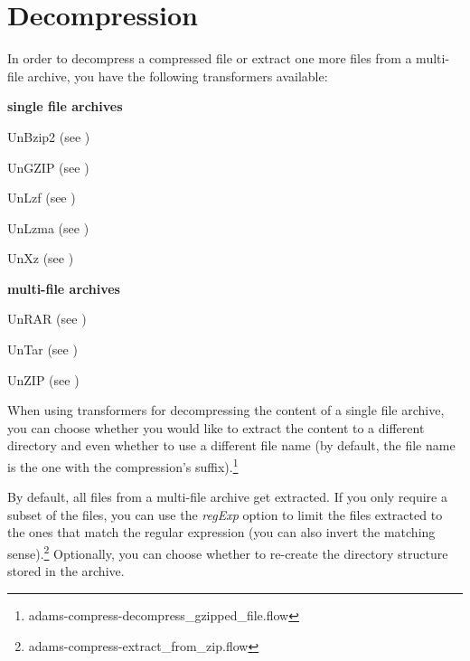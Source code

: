 \documentclass[a4paper]{book}
\begin{document}
\chapter{Decompression}
In order to decompress a compressed file or extract one more files from a
multi-file archive, you have the following transformers available:
\begin{tight_itemize}
	\item \textbf{single file archives}
	\begin{tight_itemize}
		\item UnBzip2 (see \cite{bzip2})
		\item UnGZIP (see \cite{gzip})
		\item UnLzf (see \cite{lzf})
		\item UnLzma (see \cite{lzma})
		\item UnXz (see \cite{xz})
	\end{tight_itemize}
	\item \textbf{multi-file archives}
	\begin{tight_itemize}
		\item UnRAR (see \cite{rar})
		\item UnTar (see \cite{tar})
		\item UnZIP (see \cite{zip})
	\end{tight_itemize}
\end{tight_itemize}

When using transformers for decompressing the content of a single file archive,
you can choose whether you would like to extract the content to a different 
directory and even whether to use a different file name (by default, the file name
is the one with the compression's suffix).\footnote{adams-compress-decompress\_gzipped\_file.flow}

By default, all files from a multi-file archive get extracted. If you only 
require a subset of the files, you can use the \textit{regExp} option to
limit the files extracted to the ones that match the regular expression (you
can also invert the matching sense).\footnote{adams-compress-extract\_from\_zip.flow}
Optionally, you can choose whether to re-create the directory structure 
stored in the archive.


\end{document}
